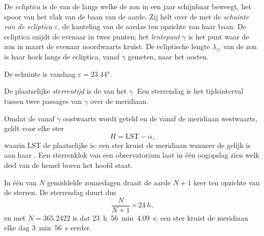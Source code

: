 \begin{definition}[De ecliptica]\label{def:b1:spherical-astronomy:ecliptic}
De \emph{ecliptica} is de  van de  langs
welke de zon in een jaar schijnbaar beweegt, het spoor van het vlak van de
baan van de aarde. Zij helt over de  met de
\emph{schuinte van de ecliptica}
$\varepsilon$, de kanteling van de aardas ten opzichte van haar baan. De
ecliptica snijdt de evenaar in twee punten; het \emph{lentepunt}
$\gamma$ is het punt waar de zon in maart de evenaar noordwaarts kruist. De
ecliptische lengte $\lambda_\odot$ van de zon is
haar hoek langs de ecliptica, vanaf $\gamma$ gemeten, naar het oosten.
\end{definition}

De schuinte is vandaag $\varepsilon = \ang{23.44}$.

\begin{definition}[Sterrentijd]\label{def:b1:spherical-astronomy:sidereal-time}
De plaatselijke \emph{sterrentijd} is de  van het
 $\gamma$. Een sterrendag is het tijdsinterval tussen twee passages
van $\gamma$ over de meridiaan.
\end{definition}

Omdat de  vanaf $\gamma$ oostwaarts wordt geteld en de 
vanaf de meridiaan westwaarts, geldt voor elke ster
\[
  H = \mathrm{LST} - \alpha ,
\]
waarin LST de plaatselijke  is: een ster kruist de meridiaan wanneer
de  gelijk is aan haar . Een sterrenklok van een
observatorium laat in één oogopslag zien welk deel van de hemel boven het hoofd
staat.

\begin{proposition}\label{prop:b1:spherical-astronomy:sidereal-day}
In één  van $N$ gemiddelde zonnedagen draait de aarde $N + 1$ keer
ten opzichte van de sterren. De sterrendag duurt dus
\[
  \frac{N}{N + 1}\times\qty{24}{h},
\]
en met $N = 365.2422$ is dat \qty{23}{h}~\qty{56}{min}~\qty{4.09}{s}: een ster
kruist de meridiaan elke dag \qty{3}{min}~\qty{56}{s} 
eerder.
\end{proposition}

